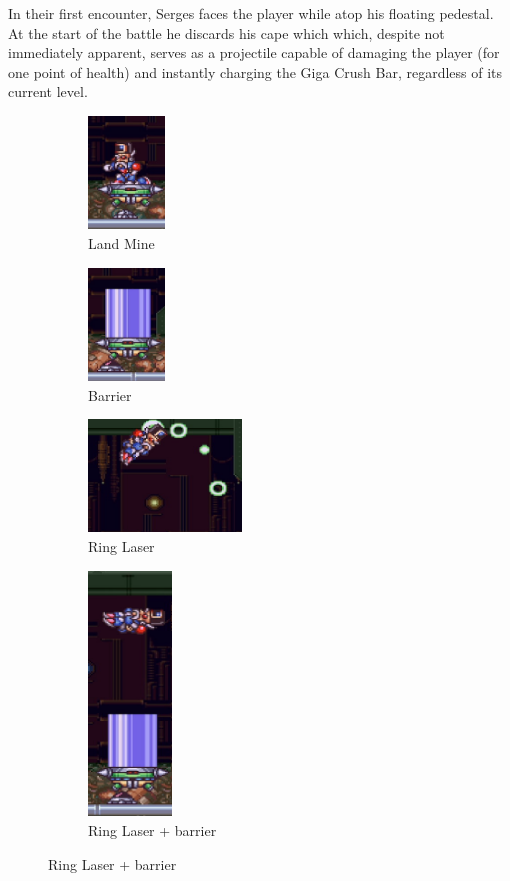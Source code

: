 In their first encounter, Serges faces the player while atop his floating pedestal. At the start of the battle he discards his cape which which, despite not immediately apparent, serves as a projectile capable of damaging the player (for one point of health) and instantly charging the Giga Crush Bar, regardless of its current level.
 \begin{figure}[htp]
	\centering
	\begin{minipage}{.45\linewidth}
		\centering
		\begin{subfigure}[t]{0.4\linewidth}
			\centering
			\includegraphics[height=3cm]{figures/X2/Hunter_stages/Serges_mines.png}
			\caption{Land Mine}	
		\end{subfigure}
		\begin{subfigure}[t]{0.4\linewidth}
			\centering
			\includegraphics[height=3cm]{figures/X2/Hunter_stages/Serges_barrier.png}
			\caption{Barrier}
		\end{subfigure}
		\begin{subfigure}{\linewidth}
			\centering
			\includegraphics[height=3cm]{figures/X2/Hunter_stages/Serges_beams.png}
			\caption{Ring Laser}
		\end{subfigure}
	\end{minipage}
	\begin{minipage}{.3\linewidth}		
		\centering
		\begin{subfigure}[t]{\linewidth}
			\centering
			\includegraphics[height=6.5cm]{figures/X2/Hunter_stages/Serges_barrier_jump.png}
			\caption{Ring Laser + barrier}
		\end{subfigure}
	\end{minipage}
\end{figure}
